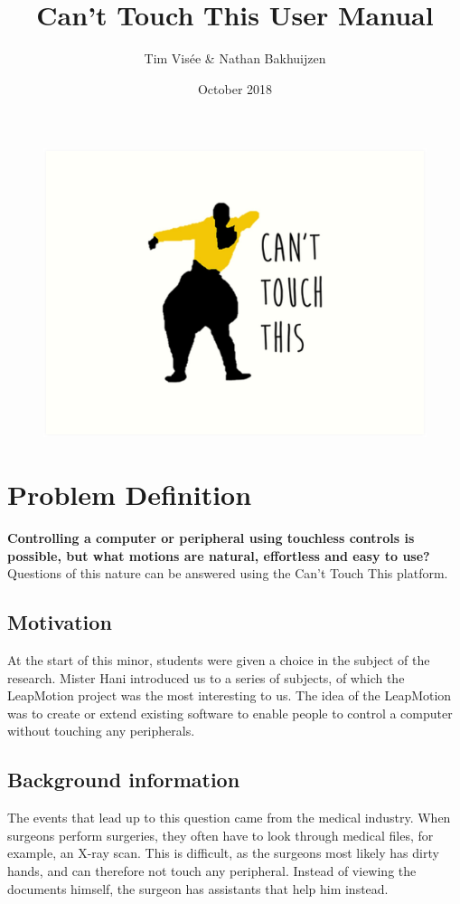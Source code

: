 \documentclass[a4paper]{article}
\title{Can't Touch This User Manual}
\author{Tim Visée \& Nathan Bakhuijzen}
\date{October 2018}
\begin{document}
  \maketitle
  \begin{figure}[h]
    \centering
    \includegraphics[width=\linewidth]{cant-touch-this}
  \end{figure}
  \clearpage

  \section{Problem Definition}
  \textbf{Controlling a computer or peripheral using touchless controls is
    possible, but what motions are natural, effortless and easy to use?}
  Questions of this nature can be answered using the Can't Touch This platform.

  \subsection{Motivation}
  At the start of this minor, students were given a choice in the subject of the
  research. Mister Hani introduced us to a series of subjects, of which the
  LeapMotion project was the most interesting to us. The idea of the LeapMotion
  was to create or extend existing software to enable people to control a
  computer without touching any peripherals.

  \subsection{Background information}
  The events that lead up to this question came from the medical industry. When
  surgeons perform surgeries, they often have to look through medical files, for
  example, an X-ray scan. This is difficult, as the surgeons most likely has
  dirty hands, and can therefore not touch any peripheral. Instead of viewing
  the documents himself, the surgeon has assistants that help him instead.
\end{document}
